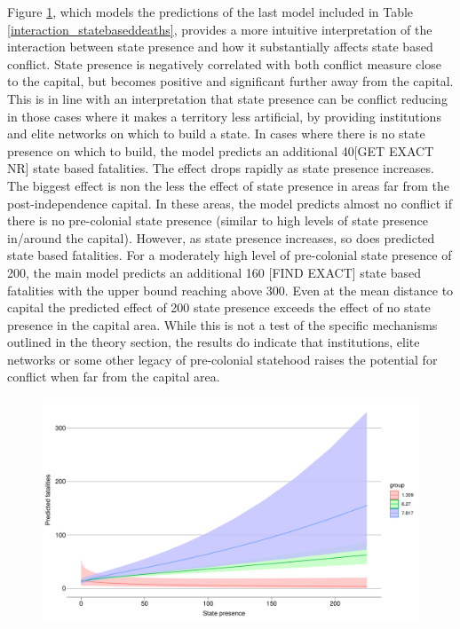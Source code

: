 \documentclass[12pt]{article}
\begin{document}
Figure \ref{deaths_int}, which models the predictions of the last model included
in Table \ref{interaction_statebaseddeaths}, provides a more
intuitive interpretation of the interaction between state presence and how it
substantially affects state based conflict. State presence is negatively
correlated with both conflict measure close to the capital, but becomes positive
and significant further away from the capital. This is in line with an
interpretation that state presence can be conflict reducing in those cases where
it makes a territory less artificial, by providing institutions and elite
networks on which to build a state. In cases where there is no state presence on
which to build, the model predicts an additional 40[GET EXACT NR] state based
fatalities. The effect drops rapidly as state presence increases. The
biggest effect is non the less the effect of state presence in areas far
from the post-independence capital. In these areas, the model predicts almost no
conflict if there is no pre-colonial state presence (similar to high levels of
state presence in/around the capital). However, as state presence increases, so
does predicted state based fatalities. For a moderately high level of
pre-colonial state presence of 200, the main model predicts an additional 160
[FIND EXACT] state based fatalities with the upper bound reaching above 300.
Even at the mean distance to capital the predicted effect of 200 state presence
exceeds the effect of no state presence in the capital area. While this is not a
test of the specific mechanisms outlined in the theory section, the results do
indicate that institutions, elite networks or some other legacy of pre-colonial
statehood raises the potential for conflict when far from the capital area.



\begin{figure}[htpb]
	\centering
	\includegraphics[width=\linewidth]{"../R/Output/deathsIntPlot.pdf"}
	\caption{}
	\label{deaths_int}
\end{figure}
\end{document}
